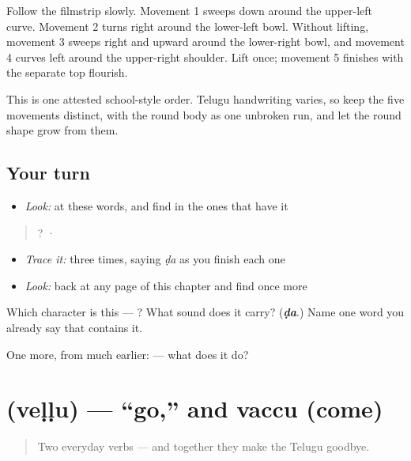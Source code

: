 Follow the filmstrip slowly. Movement 1 sweeps down around the upper-left curve. Movement 2 turns right around the lower-left bowl. Without lifting, movement 3 sweeps right and upward around the lower-right bowl, and movement 4 curves left around the upper-right shoulder. Lift once; movement 5 finishes with the separate top flourish.

This is one attested school-style order. Telugu handwriting varies, so keep the five movements distinct, with the round body as one unbroken run, and let the round shape grow from them.

\subsection*{Your turn}
\begin{itemize}
\raggedright
  \item \emph{Look:} at these words, and find  in the ones that have it
\end{itemize}

\begin{quote}
  ?  ·  
\end{quote}

\begin{itemize}
\raggedright
  \item \emph{Trace it:}  three times, saying \emph{ḍa} as you finish each one
  \item \emph{Look:} back at any page of this chapter and find  once more
\end{itemize}

\begin{tcolorbox}[breakable,colback=teal!4,colframe=teal!35!black,title={Before you move on}]
Which character is this — ? What sound does it carry? (\emph{\textbf{ḍa}}.) Name one word you already say that contains it.

One more, from much earlier:  — what does it do?
\end{tcolorbox}
\section[\texorpdfstring{\te{వెళ్ళు} (veḷḷu)}{వెళ్ళు (veḷḷu)}]{ (veḷḷu) — \textquotedblleft{}go,\textquotedblright{} and vaccu (come)}

\label{lesson:TE-C04-vellu}



\begin{quote}
Two everyday verbs — and together they make the Telugu goodbye.
\end{quote}

